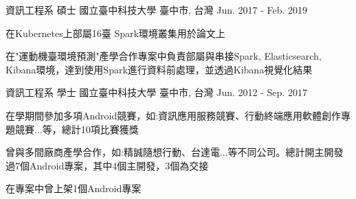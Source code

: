 

\begin{cventries}

    \cventry
    {資訊工程系 碩士} %
    {國立臺中科技大學} %
    {臺中市, 台灣} %
    {Jun. 2017 - Feb. 2019} %
    {
      \begin{cvitems} %
        \item {在Kubernetes上部屬16臺 Spark環境叢集用於論文上}
        \item {在"運動機臺環境預測"產學合作專案中負責部屬與串接Spark, Elasticsearch, Kibana環境，達到使用Spark進行資料前處理，並透過Kibana視覺化結果}
      \end{cvitems}
    }

    \cventry
    {資訊工程系 學士} %
    {國立臺中科技大學} %
    {臺中市, 台灣} %
    {Jun. 2012 - Sep. 2017} %
    {
      \begin{cvitems} %
        \item{在學期間參加多項Android競賽，如:資訊應用服務競賽、行動終端應用軟體創作專題競賽...等，總計10項比賽獲獎}
        \item{曾與多間廠商產學合作，如:精誠隨想行動、台達電...等不同公司。總計開主開發過7個Android專案，其中4個主開發，3個為交接}
        \item{在專案中曾上架1個Android專案}
      \end{cvitems}
    }

\end{cventries}
